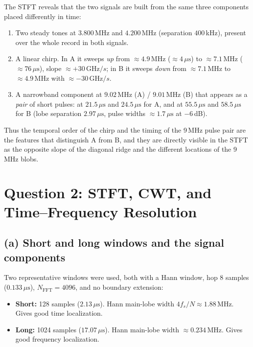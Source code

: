 \documentclass[11pt]{article}
\newcommand{\us}{\ensuremath{\,\mu\mathrm{s}}}
\newcommand{\MHz}{\ensuremath{\,\mathrm{MHz}}}
\newcommand{\GHz}{\ensuremath{\,\mathrm{GHz}}}
\begin{document}
The STFT reveals that the two signals are built from the same three
components placed differently in time:

\begin{enumerate}[leftmargin=1.4em]
  \item Two steady tones at $3.800\MHz$ and $4.200\MHz$ (separation
  $400$\,kHz), present over the whole record in both signals.
  \item A linear chirp. In A it sweeps \emph{up} from $\approx4.9\MHz$
  ($\approx4\us$) to $\approx7.1\MHz$ ($\approx76\us$), slope
  $\approx+30\GHz/s$; in B it sweeps \emph{down} from $\approx7.1\MHz$ to
  $\approx4.9\MHz$ with $\approx-30\GHz/s$.
  \item A narrowband component at $9.02\MHz$ (A) / $9.01\MHz$ (B) that appears
  as a \emph{pair} of short pulses: at $21.5\us$ and $24.5\us$ for A, and at
  $55.5\us$ and $58.5\us$ for B (lobe separation $2.97\us$, pulse widths
  $\approx1.7\us$ at $-6$\,dB).
\end{enumerate}

Thus the temporal order of the chirp and the timing of the 9\,MHz pulse pair
are the features that distinguish A from B, and they are directly visible in
the STFT as the opposite slope of the diagonal ridge and the different
locations of the 9\,MHz blobs.

\section{Question 2: STFT, CWT, and Time--Frequency Resolution}

\subsection*{(a) Short and long windows and the signal components}

Two representative windows were used, both with a Hann window, hop
$8$ samples ($0.133\us$), $N_{\mathrm{FFT}}=4096$, and no boundary extension:

\begin{itemize}[leftmargin=1.4em]
  \item \textbf{Short:} 128 samples ($2.13\us$). Hann main-lobe width
  $4f_s/N\approx1.88\MHz$. Gives good time localization.
  \item \textbf{Long:} 1024 samples ($17.07\us$). Hann main-lobe width
  $\approx0.234\MHz$. Gives good frequency localization.
\end{itemize}
\end{document}
